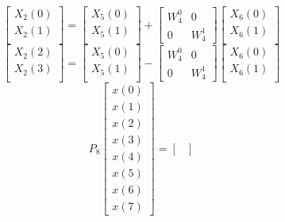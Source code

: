 \documentclass[journal,12pt,twocolumn]{IEEEtran}
\renewcommand\thesection{\arabic{section}}
\begin{document}
\begin{enumerate}[label=\arabic*.,ref=\thesection.\theenumi]
\begin{equation}
	\end{equation}
	\begin{equation}
		\begin{bmatrix}
			X_{2}(0) \\ 
			X_{2}(1)\\ 
		\end{bmatrix}
		=
		\begin{bmatrix}
			X_{5}(0) \\ 
			X_{5}(1)\\ 
		\end{bmatrix}
		+
		\begin{bmatrix}
			W^{0}_{4} & 0\\
			0 & W^{1}_{4}
		\end{bmatrix}
		\begin{bmatrix}
			X_{6}(0) \\ 
			X_{6}(1) \\ 
		\end{bmatrix}
	\end{equation}
	\begin{equation}
		\begin{bmatrix}
			X_{2}(2) \\ 
			X_{2}(3)\\ 
		\end{bmatrix}
		=
		\begin{bmatrix}
			X_{5}(0) \\ 
			X_{5}(1)\\ 
		\end{bmatrix}
		-
		\begin{bmatrix}
			W^{0}_{4} & 0\\
			0 & W^{1}_{4}
		\end{bmatrix}
		\begin{bmatrix}
			X_{6}(0) \\ 
			X_{6}(1) \\ 
		\end{bmatrix}
	\end{equation}
	\begin{equation}
		P_{8}
		\begin{bmatrix}
			x(0) \\ 
			x(1) \\ 
			x(2) \\ 
			x(3) \\ 
			x(4) \\ 
			x(5) \\
			x(6) \\
			x(7)
		\end{bmatrix}
		= 
		\begin{bmatrix}

\end{bmatrix}
\end{equation}
\end{enumerate}
\end{document}
